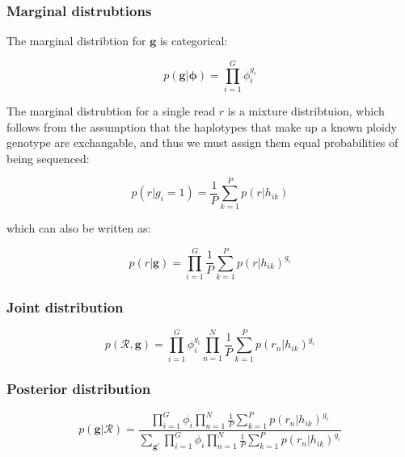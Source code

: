\documentclass{article}
\begin{document}
\subsubsection{Marginal distrubtions}

The marginal distribtion for $\boldsymbol{g}$ is categorical:

\begin{equation}
\label{eq:ind_g_marginal}
    p(\boldsymbol{g} | \boldsymbol{\phi}) = \prod_{i = 1}^G \phi_i^{g_i}
\end{equation}

The marginal distrubtion for a single read $r$ is a mixture distribtuion, which follows from the assumption that the haplotypes that make up a known ploidy genotype are exchangable, and thus we must assign them equal probabilities of being sequenced:

\begin{equation}
\label{eq:ind_read_marginal}
 p(r | g_i = 1) = \frac{1}{P} \sum^P_{k = 1} p(r | h_{ik})
\end{equation}

which can also be written as:

\begin{equation}
\label{eq:ind_read_marginal2}
 p(r | \boldsymbol{g}) = \prod_{i = 1}^G \frac{1}{P} \sum^P_{k = 1} p(r | h_{ik})^{g_i}
\end{equation}

\subsubsection{Joint distribution}

\begin{equation}
\label{eq:ind_jp}
 p(\mathcal{R}, \boldsymbol{g}) = \prod_{i = 1}^G \phi_i^{g_i} \prod^N_{n = 1} \frac{1}{P} \sum^P_{k = 1} p(r_n | h_{ik})^{g_i}
\end{equation}

\subsubsection{Posterior distribution}

\begin{equation}
\label{eq:ind_post}
 p(\boldsymbol{g} | \mathcal{R}) = \frac{\prod_{i = 1}^G \phi_i \prod^N_{n = 1} \frac{1}{P} \sum^P_{k = 1} p(r_n | h_{ik})^{g_i}}{\sum_{\boldsymbol{g}'}\prod_{i = 1}^G \phi_i \prod^N_{n = 1} \frac{1}{P} \sum^P_{k = 1} p(r_n | h_{ik})^{g_i}}
\end{equation}
\end{document}
